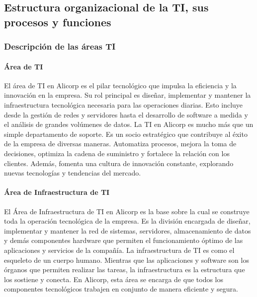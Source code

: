 
\subsection{Estructura organizacional de la TI, sus procesos y funciones}
    \subsubsection{Descripción de las áreas TI}
        \paragraph{Área de TI}
        El área de TI en Alicorp es el pilar tecnológico que impulsa la eficiencia y la innovación en la empresa. Su rol principal es diseñar, implementar y mantener la infraestructura tecnológica necesaria para las operaciones diarias. Esto incluye desde la gestión de redes y servidores hasta el desarrollo de software a medida y el análisis de grandes volúmenes de datos. 
        La TI en Alicorp es mucho más que un simple departamento de soporte. Es un socio estratégico que contribuye al éxito de la empresa de diversas maneras. Automatiza procesos, mejora la toma de decisiones, optimiza la cadena de suministro y fortalece la relación con los clientes. Además, fomenta una cultura de innovación constante, explorando nuevas tecnologías y tendencias del mercado. 
    
        \paragraph{Área de Infraestructura de TI}
        El Área de Infraestructura de TI en Alicorp es la base sobre la cual se construye toda la operación tecnológica de la empresa. Es la división encargada de diseñar, implementar y mantener la red de sistemas, servidores, almacenamiento de datos y demás componentes hardware que permiten el funcionamiento óptimo de las aplicaciones y servicios de la compañía. 
        La infraestructura de TI es como el esqueleto de un cuerpo humano. Mientras que las aplicaciones y software son los órganos que permiten realizar las tareas, la infraestructura es la estructura que los sostiene y conecta. En Alicorp, esta área se encarga de que todos los componentes tecnológicos trabajen en conjunto de manera eficiente y segura. 
    
